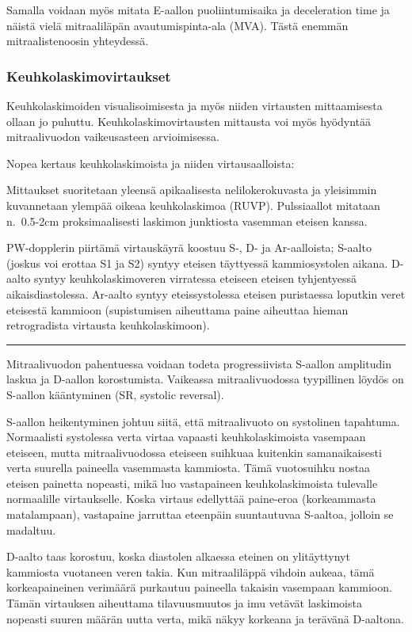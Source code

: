\documentclass[
]{book}
\begin{document}
Samalla voidaan myös mitata E-aallon puoliintumisaika ja deceleration time ja näistä vielä mitraaliläpän avautumispinta-ala (MVA). Tästä enemmän mitraalistenoosin yhteydessä.

\subsubsection{Keuhkolaskimovirtaukset}\label{keuhkolaskimovirtaukset-2}

Keuhkolaskimoiden visualisoimisesta ja myös niiden virtausten mittaamisesta ollaan jo puhuttu. Keuhkolaskimovirtausten mittausta voi myös hyödyntää mitraalivuodon vaikeusasteen arvioimisessa.

Nopea kertaus keuhkolaskimoista ja niiden virtausaalloista:

Mittaukset suoritetaan yleensä apikaalisesta nelilokerokuvasta ja yleisimmin kuvannetaan ylempää oikeaa keuhkolaskimoa (RUVP). Pulssiaallot mitataan n.~0.5-2cm proksimaalisesti laskimon junktiosta vasemman eteisen kanssa.

PW-dopplerin piirtämä virtauskäyrä koostuu S-, D- ja Ar-aalloista; S-aalto (joskus voi erottaa S1 ja S2) syntyy eteisen täyttyessä kammiosystolen aikana. D-aalto syntyy keuhkolaskimoveren virratessa eteiseen eteisen tyhjentyessä aikaisdiastolessa. Ar-aalto syntyy eteissystolessa eteisen puristaessa loputkin veret eteisestä kammioon (supistumisen aiheuttama paine aiheuttaa hieman retrogradista virtausta keuhkolaskimoon).

\begin{center}\rule{0.5\linewidth}{0.5pt}\end{center}

Mitraalivuodon pahentuessa voidaan todeta progressiivista S-aallon amplitudin laskua ja D-aallon korostumista. Vaikeassa mitraalivuodossa tyypillinen löydös on S-aallon kääntyminen (SR, systolic reversal).

S-aallon heikentyminen johtuu siitä, että mitraalivuoto on systolinen tapahtuma. Normaalisti systolessa verta virtaa vapaasti keuhkolaskimoista vasempaan eteiseen, mutta mitraalivuodossa eteiseen suihkuaa kuitenkin samanaikaisesti verta suurella paineella vasemmasta kammiosta. Tämä vuotosuihku nostaa eteisen painetta nopeasti, mikä luo vastapaineen keuhkolaskimoista tulevalle normaalille virtaukselle. Koska virtaus edellyttää paine-eroa (korkeammasta matalampaan), vastapaine jarruttaa eteenpäin suuntautuvaa S-aaltoa, jolloin se madaltuu.

D-aalto taas korostuu, koska diastolen alkaessa eteinen on ylitäyttynyt kammiosta vuotaneen veren takia. Kun mitraaliläppä vihdoin aukeaa, tämä korkeapaineinen verimäärä purkautuu paineella takaisin vasempaan kammioon. Tämän virtauksen aiheuttama tilavuusmuutos ja imu vetävät laskimoista nopeasti suuren määrän uutta verta, mikä näkyy korkeana ja terävänä D-aaltona.
\end{document}
